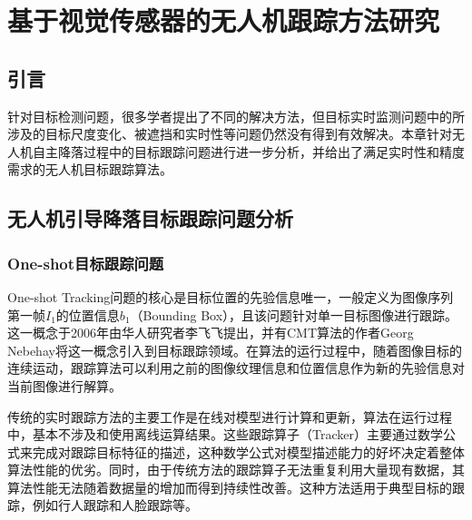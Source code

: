 \chapter{基于视觉传感器的无人机跟踪方法研究}
\section{引言}
针对目标检测问题，很多学者提出了不同的解决方法，但目标实时监测问题中的所涉及的目标尺度变化、被遮挡和实时性等问题仍然没有得到有效解决。本章针对无人机自主降落过程中的目标跟踪问题进行进一步分析，并给出了满足实时性和精度需求的无人机目标跟踪算法。

\section{无人机引导降落目标跟踪问题分析}
\subsection{One-shot目标跟踪问题}
One-shot Tracking问题的核心是目标位置的先验信息唯一，一般定义为图像序列第一帧$I_1$的位置信息$b_1$（Bounding Box），且该问题针对单一目标图像进行跟踪。这一概念于2006年由华人研究者李飞飞提出\cite{fei2006one}，并有CMT算法\cite{Nebehay2016}的作者Georg Nebehay将这一概念引入到目标跟踪领域。在算法的运行过程中，随着图像目标的连续运动，跟踪算法可以利用之前的图像纹理信息和位置信息作为新的先验信息对当前图像进行解算。

传统的实时跟踪方法的主要工作是在线对模型进行计算和更新，算法在运行过程中，基本不涉及和使用离线运算结果。这些跟踪算子（Tracker）主要通过数学公式来完成对跟踪目标特征的描述，这种数学公式对模型描述能力的好坏决定着整体算法性能的优劣。同时，由于传统方法的跟踪算子无法重复利用大量现有数据，其算法性能无法随着数据量的增加而得到持续性改善。这种方法适用于典型目标的跟踪，例如行人跟踪和人脸跟踪等。

